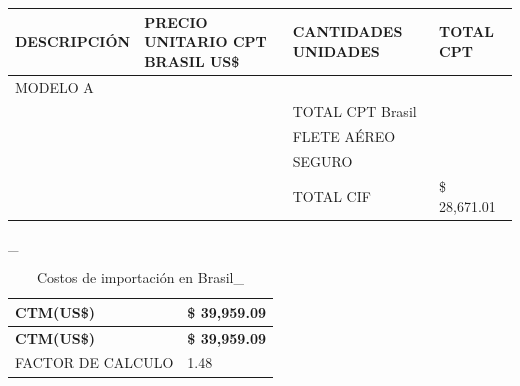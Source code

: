 \documentclass[
  stu,
  floatsintext,
  longtable,
  a4paper,
  nolmodern,
  notxfonts,
  notimes,
  colorlinks=true,linkcolor=blue,citecolor=blue,urlcolor=blue]{apa7}
\begin{document}
\begin{table}

{\caption{{Valor de exportación CIF -- costo de la tuna en el puerto de
Sao Paulo}{\label{tbl-mytable}}}}

\begin{longtable}[]{@{}
  >{\raggedright\arraybackslash}p{}
  >{\raggedright\arraybackslash}p{}
  >{\raggedright\arraybackslash}p{}
  >{\raggedright\arraybackslash}p{}@{}}
\toprule\noalign{}
\begin{minipage}[b]{\linewidth}\raggedright
\textbf{DESCRIPCIÓN}
\end{minipage} & \begin{minipage}[b]{\linewidth}\raggedright
\textbf{PRECIO UNITARIO CPT BRASIL US\$}
\end{minipage} & \begin{minipage}[b]{\linewidth}\raggedright
\textbf{CANTIDADES UNIDADES}
\end{minipage} & \begin{minipage}[b]{\linewidth}\raggedright
\textbf{TOTAL CPT}
\end{minipage} \\
\midrule\noalign{}
\endhead
\bottomrule\noalign{}
\endlastfoot
MODELO A & 17.94917867 & 1500 & 26923.77 \\
& & TOTAL CPT Brasil & 26923.77 \\
& & FLETE AÉREO & 1154.74 \\
& & SEGURO & 592.5 \\
& & TOTAL CIF & \$ 28,671.01 \\
\end{longtable}

\end{table}

\_

\begin{longtable}[]{@{}ll@{}}
\caption{Costos de importación en Brasil\_}\tabularnewline
\toprule\noalign{}
\textbf{CTM(US\$)} & \textbf{\$ 39,959.09} \\
\midrule\noalign{}
\endfirsthead
\toprule\noalign{}
\textbf{CTM(US\$)} & \textbf{\$ 39,959.09} \\
\midrule\noalign{}
\endhead
\bottomrule\noalign{}
\endlastfoot
FACTOR DE CALCULO & 1.48 \\
\end{longtable}
\end{document}

